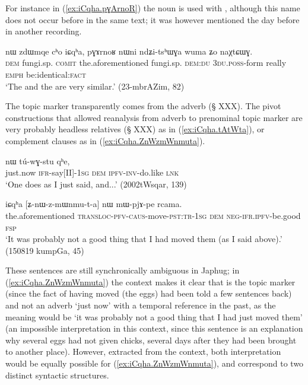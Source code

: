 For instance in (\ref{ex:iCqha.pɣArnoR}) the noun  is used with , although this name does not occur before in the same text; it was however mentioned the day before in another recording.

\begin{exe}
\ex \label{ex:iCqha.pɣArnoR}
\gll nɯ zdɯmqe cʰo iɕqʰa, pɣɤrnoʁ nɯni ndʑi-tsʰɯɣa wuma ʑo naχtɕɯɣ. \\
\textsc{dem} fungi.sp. \textsc{comit} the.aforementioned fungi.sp. \textsc{dem}:\textsc{du} \textsc{3du}.\textsc{poss}-form really \textsc{emph} be:identical:\textsc{fact} \\
\glt `The  and the  are very similar.' (23-mbrAZim, 82)
\end{exe}

 
The topic marker  transparently comes from the adverb  (§ XXX). The pivot constructions that allowed reanalysis from adverb to prenominal topic marker are very probably headless relatives (§ XXX) as in  (\ref{ex:iCqha.tAtWta}), or complement clauses as in (\ref{ex:iCqha.ZnWzmWnmuta}). 

\begin{exe}
\ex \label{ex:iCqha.tAtWta}
  nɯ tú-wɣ-stu qʰe, \\
 just.now \textsc{ifr}-say[II]-\textsc{1sg} \textsc{dem} \textsc{ipfv}-\textsc{inv}-do.like \textsc{lnk} \\
\glt `One does as I just said, and...' (2002tWsqar, 139)
\end{exe}

\begin{exe}
\ex \label{ex:iCqha.ZnWzmWnmuta}
 \gll iɕqʰa [ʑ-nɯ-z-mɯnmu-t-a] nɯ mɯ-pjɤ-pe rcama.  \\
the.aforementioned  \textsc{transloc}-\textsc{pfv}-\textsc{caus}-move-\textsc{pst}:\textsc{tr}-\textsc{1sg} \textsc{dem} \textsc{neg}-\textsc{ifr}.\textsc{ipfv}-be.good \textsc{fsp} \\
\glt `It was probably not a good thing that I had moved them (as I said above).' (150819 kumpGa, 45)
 \end{exe}
 
 These sentences are still synchronically ambiguous in Japhug; in  (\ref{ex:iCqha.ZnWzmWnmuta}) the context makes it clear that  is the topic marker (since the fact of having moved (the eggs) had been told a few sentences back) and not an adverb `just now' with a temporal reference in the past, as the meaning would be `it was probably not a good thing that I had just moved them' (an impossible interpretation in this context, since this sentence is an explanation why several eggs had not given chicks, several days after they had been brought to another place). However, extracted from the context, both interpretation would be equally possible for (\ref{ex:iCqha.ZnWzmWnmuta}), and correspond to two distinct syntactic structures.

